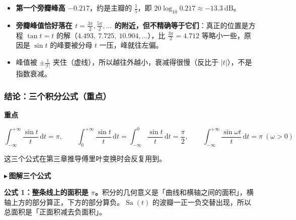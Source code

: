 \documentclass[UTF8,a4paper,11pt]{ctexart}
\newenvironment{remember}{\begin{rememberbox}\textbf{重点}\par\smallskip}{\end{rememberbox}}
\newcommand{\Sa}{\operatorname{Sa}}
\renewcommand{\d}{\,\mathrm{d}}
\newcounter{ex}[section]
\newcommand{\point}[1]{\par\addvspace{1ex}\noindent\textcolor{ptteal}{$\blacktriangleright$\,\textbf{#1}}\ }
\begin{document}
\begin{itemize}[nosep]
\item \textbf{第一个旁瓣峰高 $-0.217$}，约是主瓣的 $\frac15$，即 $20\log_{10}0.217\approx-13.3\ \mathrm{dB}$。
\item \textbf{旁瓣峰值恰好落在 $t=\tfrac{3\pi}{2},\tfrac{5\pi}{2},\dots$ 的附近，但不精确等于它们}：真正的位置是方程 $\tan t=t$ 的解（$4.493,\ 7.725,\ 10.904,\dots$），比 $\frac{3\pi}2=4.712$ 等略小一些，原因是 $\sin t$ 的峰要被分母 $t$ 一压，峰就往左偏。
\item 峰值被 $\pm\frac1{|t|}$ 夹住（虚线），所以越往外越小，衰减得很慢（反比于 $|t|$），不是指数衰减。
\end{itemize}

\subsubsection*{结论：三个积分公式（重点）}
\begin{remember}
\[
\int_{-\infty}^{+\infty}\frac{\sin t}{t}\d t=\pi,\qquad
\int_{0}^{+\infty}\frac{\sin t}{t}\d t=\int_{-\infty}^{0}\frac{\sin t}{t}\d t=\frac{\pi}{2},\qquad
\int_{-\infty}^{+\infty}\frac{\sin\omega t}{t}\d t=\pi\ (\omega>0)
\]
\end{remember}
这三个公式在第三章推导傅里叶变换时会反复用到。

\point{图解三个公式}\par
\textbf{公式 1：整条线上的面积是 $\pi$。}积分的几何意义是「曲线和横轴之间的面积」，横轴上方的部分算正，下方的部分算负。$\Sa(t)$ 的波瓣一正一负交替出现，所以总面积是「正面积减去负面积」。
\end{document}
